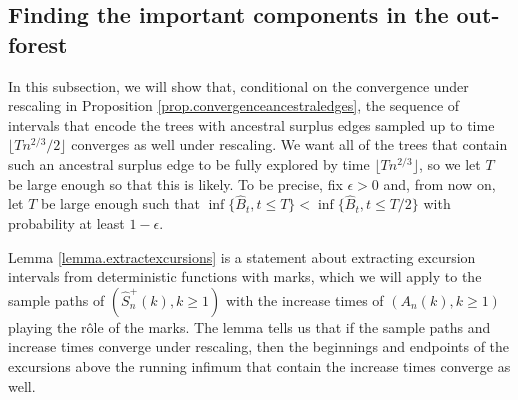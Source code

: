 \subsection{Finding the important components in the out-forest}\label{subsec.componentswithancestral}

In this subsection, we will show that, conditional on the convergence under rescaling in Proposition \ref{prop.convergenceancestraledges}, the sequence of intervals that encode the trees with ancestral surplus edges sampled up to time $\lfloor Tn^{2/3}/2\rfloor $ converges as well under rescaling. We want all of the trees that contain such an ancestral surplus edge to be fully explored by time $\lfloor Tn^{2/3}\rfloor$, so we let $T$ be large enough so that this is likely. To be precise, fix $\epsilon>0$ and, from now on, let $T$ be large enough such that $\inf\{\hat{B}_t, t\leq T\}<\inf\{\hat{B}_t, t\leq T/2\}$ with probability at least $1-\epsilon$.

Lemma \ref{lemma.extractexcursions} is a statement about extracting excursion intervals from deterministic functions with marks, which we will apply to the sample paths of $(\hat{S}_n^{+}(k),k\geq 1)$ with the increase times of $(A_n(k),k\geq 1)$ playing the rôle of the marks. The lemma tells us that if the sample paths and increase times converge under rescaling, then the beginnings and endpoints of the excursions above the running infimum that contain the increase times converge as well. 

